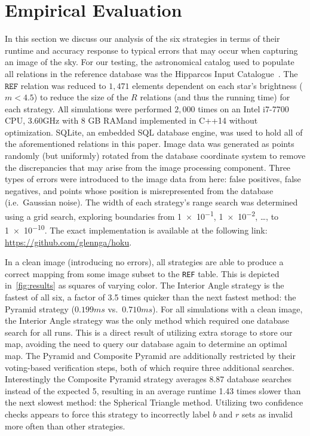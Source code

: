 \newcommand{\AVG}{\mathit{AVG}}

\section{Empirical Evaluation}\label{sec:empiricalEvaluation}
In this section we discuss our analysis of the six strategies in terms of their runtime and accuracy response to typical errors that may occur when capturing an image of the sky.
For our testing, the astronomical catalog used to populate all relations in the reference database was the Hipparcos Input Catalogue~\cite{perryman:hipparcosCatalogue}. 
The $\texttt{REF}$ relation was reduced to $1{,}471$ elements dependent on each star's brightness ($m < 4.5$) to reduce the size of the $R$ relations (and thus the running time) for each strategy.
All simulations were performed $2{,}000$ times on an Intel i7-7700 CPU, 3.60GHz with 8 GB RAM\@ and implemented in C++14 without optimization.
SQLite, an embedded SQL database engine, was used to hold all of the aforementioned relations in this paper.
Image data was generated as points randomly (but uniformly) rotated from the database coordinate system to remove the discrepancies that may arise from the image processing component.
Three types of errors were introduced to the image data from here: false positives, false negatives, and points whose position is misrepresented from the database (i.e.\ Gaussian noise).
The width of each strategy's range search was determined using a grid search, exploring boundaries from \num{1e-1}, \num{1e-2}, \ldots, to \num{1e-10}.
The exact implementation is available at the following link: \url{https://github.com/glennga/hoku}.

In a clean image (introducing no errors), all strategies are able to produce a correct mapping from some image subset to the \texttt{REF} table.
This is depicted in~\autoref{fig:results} as squares of varying color.
The Interior Angle strategy is the fastest of all six, a factor of 3.5 times quicker than the next fastest method: the Pyramid strategy ($0.199\si{ms}$ vs.\ $0.710\si{ms}$).
For all simulations with a clean image, the Interior Angle strategy was the only method which required one database search for all runs.
This is a direct result of utilizing extra storage to store our map, avoiding the need to query our database again to determine an optimal map.
The Pyramid and Composite Pyramid are additionally restricted by their voting-based verification steps, both of which require three additional searches.
Interestingly the Composite Pyramid strategy averages 8.87 database searches instead of the expected 5, resulting in an average runtime 1.43 times slower than the next slowest method: the Spherical Triangle method.
Utilizing two confidence checks appears to force this strategy to incorrectly label $b$ and $r$ sets as invalid more often than other strategies.

